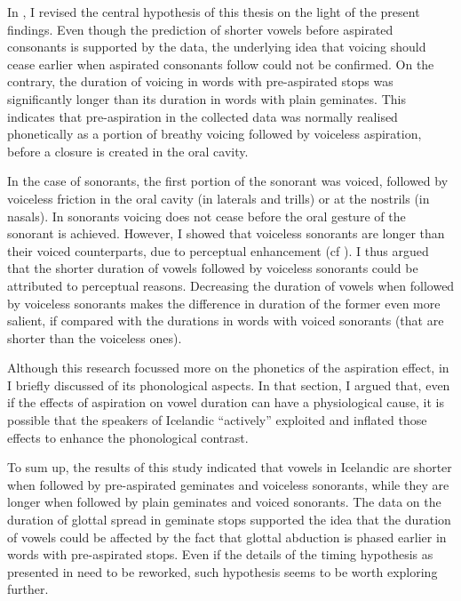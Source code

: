 \documentclass[11pt,a4paper,oneside,openany]{memoir}\usepackage[]{graphicx}\usepackage[]{color}
\begin{document}
In , I revised the central hypothesis of this thesis on the light of the present findings.
Even though the prediction of shorter vowels before aspirated consonants is supported by the data, the underlying idea that voicing should cease earlier when aspirated consonants follow could not be confirmed.
On the contrary, the duration of voicing in words with pre-aspirated stops was significantly longer than its duration in words with plain geminates.
This indicates that pre-aspiration in the collected data was normally realised phonetically as a portion of breathy voicing followed by voiceless aspiration, before a closure is created in the oral cavity.

In the case of sonorants, the first portion of the sonorant was voiced, followed by voiceless friction in the oral cavity (in laterals and trills) or at the nostrils (in nasals).
In sonorants voicing does not cease before the oral gesture of the sonorant is achieved.
However, I showed that voiceless sonorants are longer than their voiced counterparts, due to perceptual enhancement (cf ).
I thus argued that the shorter duration of vowels followed by voiceless sonorants could be attributed to perceptual reasons.
Decreasing the duration of vowels when followed by voiceless sonorants makes the difference in duration of the former even more salient, if compared with the durations in words with voiced sonorants (that are shorter than the voiceless ones).

Although this research focussed more on the phonetics of the aspiration effect, in  I briefly discussed of its phonological aspects.
In that section, I argued that, even if the effects of aspiration on vowel duration can have a physiological cause, it is possible that the speakers of Icelandic ``actively'' exploited and inflated those effects to enhance the phonological contrast.

To sum up, the results of this study indicated that vowels in Icelandic are shorter when followed by pre-aspirated geminates and voiceless sonorants, while they are longer when followed by plain geminates and voiced sonorants.
The data on the duration of glottal spread in geminate stops supported the idea that the duration of vowels could be affected by the fact that glottal abduction is phased earlier in words with pre-aspirated stops.
Even if the details of the timing hypothesis as presented in  need to be reworked, such hypothesis seems to be worth exploring further.
 
\end{document}

